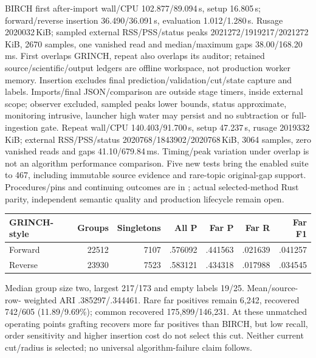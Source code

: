 \documentclass[11pt]{article}
\begin{document}
BIRCH first after-import wall/CPU 102.877/89.094\,s, setup 16.805\,s;
forward/reverse insertion 36.490/36.091\,s, evaluation 1.012/1.280\,s.
Rusage 2020032\,KiB; sampled external RSS/PSS/status peaks
2021272/1919217/2021272\,KiB, 2670 samples, one vanished read and median/maximum
gaps 38.00/168.20\,ms. First overlaps GRINCH, repeat also overlaps its auditor; retained
source/scientific/output ledgers are offline workspace, not production worker
memory. Insertion excludes final prediction/validation/cut/state capture and
labels. Imports/final JSON/comparison are outside stage timers, inside external
scope; observer excluded, sampled peaks lower bounds, status approximate,
monitoring intrusive, launcher high water may persist and no subtraction or
full-ingestion gate. Repeat wall/CPU 140.403/91.700\,s, setup 47.237\,s,
rusage 2019332\,KiB; external RSS/PSS/status 2020768/1843902/2020768\,KiB,
3064 samples, zero vanished reads and gaps 41.10/679.84\,ms. Timing/peak
variation under overlap is not an algorithm performance comparison.
Five new tests bring the enabled suite to 467, including
immutable source evidence and rare-topic original-gap support. Procedures/pins
and continuing outcomes are in
; actual selected-method
Rust parity, independent semantic quality and production lifecycle remain open.

\begin{center}
\begin{tabular}{lrrrrrr}
GRINCH-style & Groups & Singletons & All P & Far P & Far R & Far F1\\\hline
Forward & 22512 & 7107 & .576092 & .441563 & .021639 & .041257\\
Reverse & 23930 & 7523 & .583121 & .434318 & .017988 & .034545
\end{tabular}
\end{center}
Median group size two, largest 217/173 and empty labels 19/25. Mean/source-row-
weighted ARI .385297/.344461. Rare far positives remain 6,242, recovered
742/605 (11.89/9.69\%); common recovered 175,899/146,231. At these unmatched
operating points grafting recovers more far positives than BIRCH, but low recall,
order sensitivity and higher insertion cost do not select this cut. Neither
current cut/radius is selected; no universal algorithm-failure claim follows.
\end{document}
